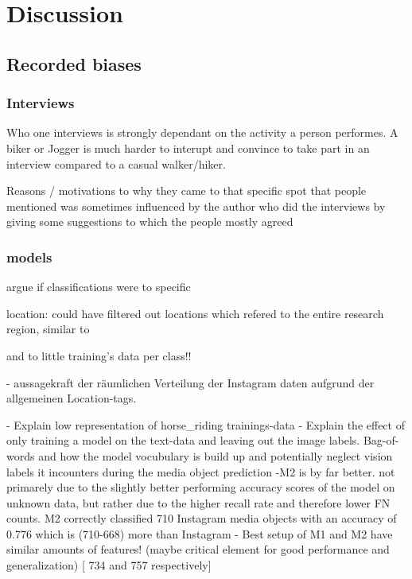\chapter{Discussion} \label{discussion}

\section{Recorded biases}

\subsection{Interviews}
Who one interviews is strongly dependant on the activity a person performes. A biker or Jogger is much harder to interupt and convince to take part in an interview compared to a casual walker/hiker.

Reasons / motivations to why they came to that specific spot that people mentioned was sometimes influenced by the author who did the interviews by giving some suggestions to which the people mostly agreed 

\subsection{models}

argue if classifications were to specific 

location: could have filtered out locations which refered to the entire research region, similar to \parencite{Heikinheimo2017}

and to little training's data per class!!

- aussagekraft der räumlichen Verteilung der Instagram daten aufgrund der allgemeinen Location-tags.


- Explain low representation of horse\_riding trainings-data
- Explain the effect of only training a model on the text-data and leaving out the image labels. Bag-of-words and how the model vocubulary is build up and potentially neglect vision labels it incounters during the media object prediction
-M2 is by far better. not primarely due to the slightly better performing accuracy scores of the model on unknown data, but rather due to the higher recall rate and therefore lower FN counts. M2 correctly classified 710 Instagram media objects with an accuracy of 0.776 which is (710-668) more than Instagram
- Best setup of M1 and M2 have similar amounts of features! (maybe critical element for good performance and generalization) [ 734 and 757 respectively]
